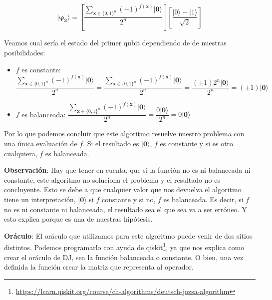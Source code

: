  \begin{equation}
     \mathbf{|\varphi_{3}\rangle}=\left[ \dfrac{\sum_{\mathbf{x} \in \{0,1\}^{n}}(-1)^{f(\mathbf{x})}|\mathbf{0}\rangle}{2^{n}}\right] \left[ \dfrac{|0\rangle - |1\rangle}{\sqrt{2}}\right]
 \end{equation}

 \vspace{10pt}

 Veamos cual sería el estado del primer qubit dependiendo de de nuestras posibilidades:\newline

 \begin{itemize}
     \item $f$ es constante:  $\dfrac{\sum_{\mathbf{x} \in \{0,1\}^{n}}(-1)^{f(\mathbf{x})}|\mathbf{0}\rangle}{2^{n}}=\dfrac{\sum_{\mathbf{x} \in \{0,1\}^{n}}(-1)^{f(\mathbf{x})}|\mathbf{0}\rangle}{2^{n}}=\dfrac{(\pm1)2^{n}|\mathbf{0}\rangle}{2^{n}}=(\pm1)|\mathbf{0}\rangle$

     \item $f$ es balanceada: 
     $\dfrac{\sum_{\mathbf{x} \in \{0,1\}^{n}}(-1)^{f(\mathbf{x})}|\mathbf{0}\rangle}{2^{n}}=\dfrac{0|\mathbf{0}\rangle}{2^{n}}=0|\mathbf{0}\rangle$
 \end{itemize}

 \vspace{5pt}

 Por lo que podemos concluir que este algoritmo resuelve nuestro problema con una única evaluación de $f$. Si el resultado es $|\mathbf{0}\rangle$, $f$ es constante y si es otro cualquiera, $f$ es balanceada. \newline

 \textbf{Observación}: Hay que tener en cuenta, que si la función no es ni balanceada ni constante, este algoritmo no soluciona el problema y el resultado no es concluyente. Esto se debe a que cualquier valor que nos devuelva el algoritmo tiene un interpretación, $|\textbf{0}\rangle$ si $f$ constante y si no, $f$ es balanceada. Es decir, si $f$ no es ni constante ni balanceada, el resultado sea el que sea va a ser erróneo. Y esto explica porque es una de nuestras hipótesis. \newline

\textbf{Oráculo}: El oráculo que utilizamos para este algoritmo puede venir de dos sitios distintos. Podemos programarlo con ayuda de qiskit\footnote{\url{https://learn.qiskit.org/course/ch-algorithms/deutsch-jozsa-algorithm}}, ya que nos explica como crear el oráculo de DJ, sea la función balanceada o constante. O bien, una vez definida la función crear la matriz que representa al operador.\newline
 
